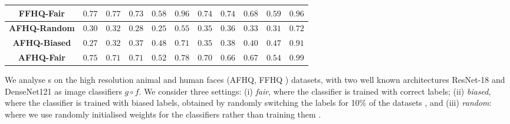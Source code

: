 \begin{table*}
{\begin{tabular}{c|ccccc|ccccc}

\textbf{FFHQ-Fair} 

& $0.77$ %
& $0.77$ %
& $0.73$ %
& $0.58$ %
& $0.96$


& $0.74$ %
& $0.74$ %
& $0.68$ %
& $0.59$ %
& $0.96$
\\ 
\midrule 

\textbf{AFHQ-Random} 

& $0.30$ %
& $0.32$ %
& $0.28$ %
& $0.25$ %
& $0.55$

& $0.35$ %
& $0.36$ %
& $0.33$ %
& $0.31$ %
& $0.72$

\\ 


\textbf{AFHQ-Biased} 

& $0.27$ %
& $0.32$ %
& $0.37$ %
& $0.48$ %
& $0.71$

& $0.35$ %
& $0.38$ %
& $0.40$ %
& $0.47$ %
& $0.91$

\\ 


\textbf{AFHQ-Fair} 

& $0.75$ %
& $0.71$ %
& $0.71$ %
& $0.52$ %
& $0.78$

& $0.70$ %
& $0.66$ %
& $0.67$ %
& $0.54$ %
& 0.99


\\ 

\bottomrule 
\end{tabular}
}
\end{table*}


We analyse \FAXIC s on the high resolution animal and human faces (AFHQ\cite{choi2020stargan}, FFHQ \cite{karras2019style}) datasets, with two well known architectures ResNet-18 \cite{he2016deep} and DenseNet121 \cite{huang2017densely} as image classifiers $g \circ f$.
We %
consider three %
settings: (i) \emph{fair}, where the classifier is trained with correct labels; (ii) \emph{biased}, where the classifier is trained with %
biased labels, obtained by randomly switching the labels for 10\% of the datasets%
, and (iii) \emph{random}: where we use randomly initialised weights for the classifiers rather than training them%
. 

